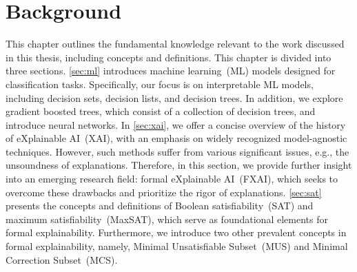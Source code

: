 \chapter{Background}\label{chap:bg}

This chapter outlines the fundamental knowledge relevant to the work discussed in this thesis,
including concepts and definitions.
%
This chapter is divided into three sections.
%
\autoref{sec:ml} introduces machine learning~(ML) models designed for classification tasks. 
%
Specifically, our focus is on interpretable ML models, including decision sets, decision lists, and decision trees. 
%
In addition, we explore gradient boosted trees, which consist of a collection of decision trees,
and introduce neural networks.
%
In \autoref{sec:xai}, we offer a concise overview of the history of eXplainable AI~(XAI), 
with an emphasis on widely recognized model-agnostic techniques.
%
However, such methods suffer from various significant issues,
e.g., the unsoundness of explanations.
%
Therefore, in this section, we provide further insight into an emerging research field: formal
eXplainable AI~(FXAI), which seeks to overcome these drawbacks and prioritize the rigor of explanations.
%
\autoref{sec:sat} presents the concepts and definitions of Boolean satisfiability~(SAT) and maximum satisfiability~(MaxSAT), which serve as foundational elements for formal explainability. 
%
Furthermore, we introduce two other prevalent concepts in formal explainability, namely, Minimal Unsatisfiable Subset~(MUS) and Minimal Correction Subset~(MCS).




